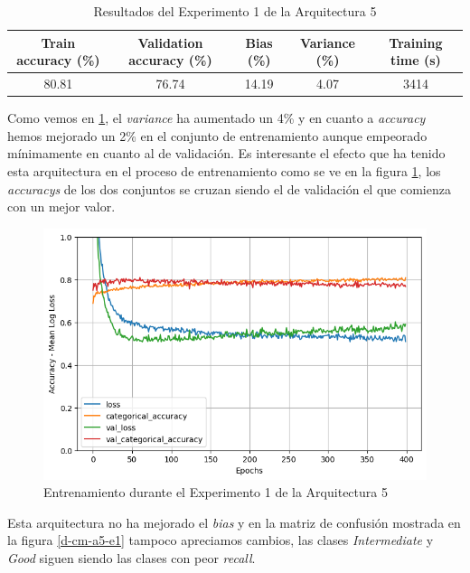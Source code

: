 \documentclass{article}
\begin{document}
			\begin{table}[!h]
				\begin{center}
					\begin{tabular}{| c | c | c | c | c |}
						\textbf{Train accuracy (\%)} & \textbf{Validation accuracy (\%)} & \textbf{Bias (\%)} & \textbf{Variance (\%)} & \textbf{Training time (s)} \\ \hline
						80.81 & 76.74 & 14.19 & 4.07 & 3414\\ \hline
					\end{tabular}
					\caption{Resultados del Experimento 1 de la Arquitectura 5}
					\label{tab:res-d-a5-e1}
				\end{center}
			\end{table}
		    
		    Como vemos en \ref{tab:res-d-a5-e1}, el \textit{variance} ha aumentado un 4\% y en cuanto a \textit{accuracy} hemos mejorado un 2\% en el conjunto de entrenamiento aunque empeorado m\'inimamente en cuanto al de validaci\'on. Es interesante el efecto que ha tenido esta arquitectura en el proceso de entrenamiento como se ve en la figura \ref{d-tr-a5-e1}, los \textit{accuracys} de los dos conjuntos se cruzan siendo el de validaci\'on el que comienza con un mejor valor.\\
		    
			\begin{figure}[!h]
				\begin{center}
					\includegraphics[scale=0.5]{d-tr-a5-e1.png}		
					\caption{Entrenamiento durante el Experimento 1 de la Arquitectura 5}	
					\label{d-tr-a5-e1}
				\end{center}
			\end{figure}
			Esta arquitectura no ha mejorado el \textit{bias} y en la matriz de confusi\'on mostrada en la figura \ref{d-cm-a5-e1} tampoco apreciamos cambios, las clases \textit{Intermediate} y \textit{Good} siguen siendo las clases con peor \textit{recall}.
			
\end{document}
